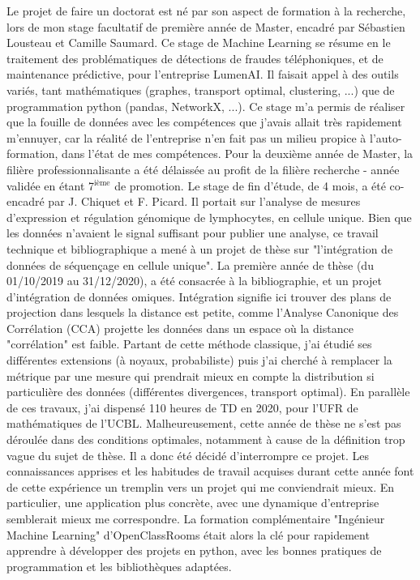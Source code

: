 \documentclass[a4paper,11pt]{article}
\begin{document}
Le projet de faire un doctorat est né par son aspect de formation à la recherche, lors de mon stage facultatif de première année de Master, encadré par Sébastien Lousteau et Camille Saumard. Ce stage  de Machine Learning se résume en le traitement des problématiques de détections de fraudes téléphoniques, et de maintenance prédictive, pour l'entreprise LumenAI. Il faisait appel à des outils variés, tant mathématiques (graphes, transport optimal, clustering, ...) que de programmation python (pandas, NetworkX, ...). 
Ce stage m'a permis de réaliser que la fouille de données avec les compétences que j'avais allait très rapidement m'ennuyer, car la réalité de l'entreprise n'en fait pas un milieu propice à l'auto-formation, dans l'état de mes compétences.
Pour la deuxième année de Master, la filière professionnalisante a été délaissée au profit de la filière recherche - année validée en étant 7$^{\text{ième}}$ de promotion.
Le stage de fin d'étude, de 4 mois, a été co-encadré par J. Chiquet et F. Picard. Il portait sur l'analyse de mesures d'expression et régulation génomique de lymphocytes, en cellule unique. Bien que les données n'avaient le signal suffisant pour publier une analyse, ce travail technique et bibliographique a mené à un projet de thèse sur "l'intégration de données de séquençage en cellule unique". La première année de thèse (du 01/10/2019 au 31/12/2020), a été consacrée à la bibliographie, et un projet d'intégration de données omiques. 
%
Intégration signifie ici trouver des plans de projection dans lesquels la distance est petite, comme l'Analyse Canonique des Corrélation (CCA) projette les données dans un espace où la distance "corrélation" est faible. Partant de cette méthode classique, j'ai étudié ses différentes extensions (à noyaux, probabiliste) puis j'ai cherché à remplacer la métrique par une mesure qui prendrait mieux en compte la distribution si particulière des données (différentes divergences, transport optimal). 
% 
En parallèle de ces travaux, j'ai dispensé 110 heures de TD en 2020, pour l'UFR de mathématiques de l'UCBL. 
Malheureusement, cette année de thèse ne s'est pas déroulée dans des conditions optimales, notamment à cause de la définition trop vague du sujet de thèse. 
%
Il a donc été décidé d'interrompre ce projet. %
%
Les connaissances apprises et les habitudes de travail acquises durant cette année font de cette expérience un tremplin vers un projet qui me conviendrait mieux. En particulier, une application plus concrète, avec une dynamique d'entreprise semblerait mieux me correspondre. La formation complémentaire "Ingénieur Machine Learning" d'OpenClassRooms était alors la clé pour rapidement apprendre à développer des projets en python, avec les bonnes pratiques de programmation et les bibliothèques adaptées. 
\end{document}
